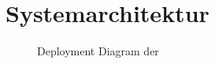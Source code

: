 \chapter{Systemarchitektur}
\label{chap:systemarchitektur}

\begin{figure}
    \centering
    
    \caption{Deployment Diagram der \shst{}}
    \label{fig:ss-deployment-diagram}
\end{figure}